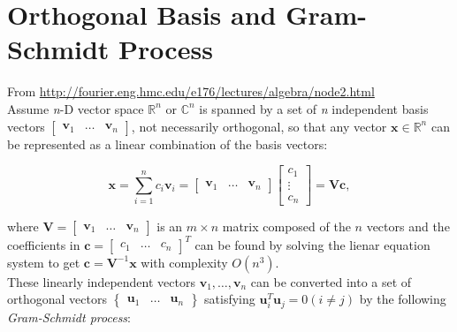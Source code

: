 \documentclass[10pt,b5paper,titlepage]{book}
\begin{document}
\chapter{Orthogonal Basis and Gram-Schmidt Process}

From \url{http://fourier.eng.hmc.edu/e176/lectures/algebra/node2.html}\\

Assume \textit{n}-D vector space $\mathbb{R}^{n}$ or $\mathbb{C}^{n}$ is spanned
by a set of \textit{n} independent basis vectors $\begin{bmatrix} \mathbf{v}_1 & \ldots & \mathbf{v}_n \end{bmatrix}$,
not necessarily orthogonal, so that any vector $\mathbf{x} \in \mathbb{R}^{n}$
can be represented as a linear combination of the basis vectors:

\begin{equation}
    \mathbf{x}
    = \sum_{i=1}^{n} c_{i} \mathbf{v}_{i}
    = \begin{bmatrix} \mathbf{v}_1 & \ldots & \mathbf{v}_n \end{bmatrix}
    \begin{bmatrix} c_1\\ \vdots\\ c_n \end{bmatrix}
    = \mathbf{V} \mathbf{c}
,\end{equation}

where $\mathbf{V} = \begin{bmatrix} \mathbf{v}_1 & \ldots & \mathbf{v}_n \end{bmatrix}$ is an
$m \times n$ matrix composed of the $n$ vectors and the coefficients in
$\mathbf{c} = \begin{bmatrix} c_1 & \ldots & c_n \end{bmatrix}^{T}$ can be
found by solving the lienar equation system to get
$\mathbf{c} = \mathbf{V}^{-1}\mathbf{x}$ with complexity $\mathit{O}(n^{3})$.\\

These linearly independent vectors $\mathbf{v}_{1}, \ldots, \mathbf{v}_{n}$ can be
converted into a set of orthogonal vectors $\begin{Bmatrix} \mathbf{u}_1 & \ldots & \mathbf{u}_n \end{Bmatrix}$
satisfying $\mathbf{u}_{i}^{T}\mathbf{u}_{j} = 0 (i \neq j)$ by the following
\textit{Gram-Schmidt process}:
\end{document}
